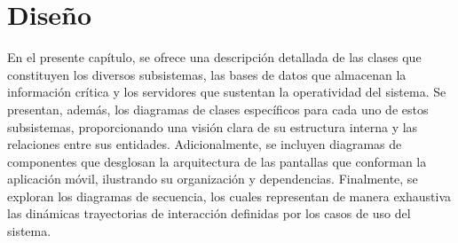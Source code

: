 \chapter{Diseño}
\label{ApendiceB}

En el presente capítulo, se ofrece una descripción detallada de las clases que constituyen los diversos subsistemas, las bases de datos que almacenan la información crítica y los servidores que sustentan la operatividad del sistema. Se presentan, además, los diagramas de clases específicos para cada uno de estos subsistemas, proporcionando una visión clara de su estructura interna y las relaciones entre sus entidades. Adicionalmente, se incluyen diagramas de componentes que desglosan la arquitectura de las pantallas que conforman la aplicación móvil, ilustrando su organización y dependencias. Finalmente, se exploran los diagramas de secuencia, los cuales representan de manera exhaustiva las dinámicas trayectorias de interacción definidas por los casos de uso del sistema.
























